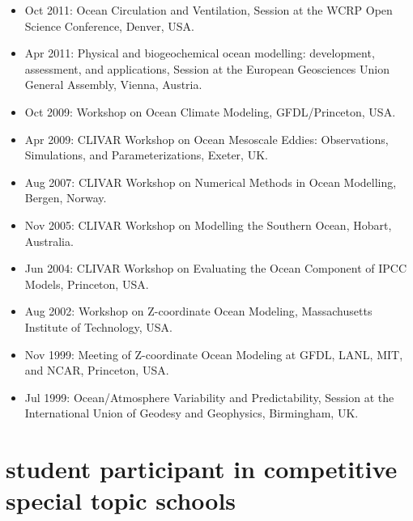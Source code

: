 \documentclass{article}
\begin{document}
\begin{itemize}[leftmargin=*]
\item Oct 2011: {\sc Ocean Circulation and Ventilation}, Session at
the WCRP Open Science Conference, Denver, USA. 

\item Apr 2011: {\sc Physical and biogeochemical ocean modelling:
  development, assessment, and applications}, Session at the European
Geosciences Union General Assembly, Vienna, Austria.

\item Oct 2009: {\sc Workshop on Ocean Climate Modeling},
  GFDL/Princeton, USA.

 \item Apr 2009: {\sc CLIVAR Workshop on Ocean Mesoscale Eddies:
    Observations, Simulations, and Parameterizations}, Exeter, UK.

\item Aug 2007: {\sc CLIVAR Workshop on Numerical Methods in Ocean
  Modelling}, Bergen, Norway.

\item Nov 2005: {\sc CLIVAR Workshop on Modelling the Southern
  Ocean}, Hobart, Australia.

\item Jun 2004: {\sc CLIVAR Workshop on Evaluating the Ocean
  Component of IPCC Models}, Princeton, USA.

\item Aug 2002: {\sc Workshop on Z-coordinate Ocean Modeling},
Massachusetts Institute of Technology, USA.

\item Nov 1999: {\sc Meeting of Z-coordinate Ocean Modeling at GFDL,
  LANL, MIT, and NCAR}, Princeton, USA.

\item Jul 1999: {\sc Ocean/Atmosphere Variability and
  Predictability}, Session at the International Union of Geodesy and
Geophysics, Birmingham, UK.

\end{itemize}


\section*{\sc \color{Maroon}  student participant in competitive special topic schools}
\vspace{-.3cm}
\end{document}
